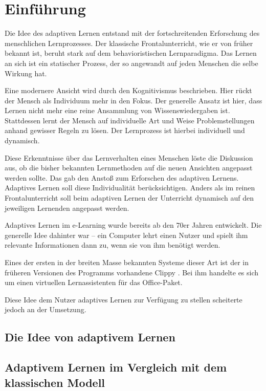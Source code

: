 \chapter{Einführung}

Die Idee des adaptiven Lernen entstand mit der fortschreitenden
Erforschung des menschlichen Lernprozesses.
Der klassische Frontalunterricht, wie er von früher bekannt ist,
beruht stark auf dem behavioristischen Lernparadigma.
Das Lernen an sich ist ein statischer Prozess, der so angewandt
auf jeden Menschen die selbe Wirkung hat.

Eine modernere Ansicht wird durch den Kognitivismus
beschrieben. Hier rückt der Mensch als Individuum mehr in den Fokus.
Der generelle Ansatz ist hier, dass Lernen nicht mehr eine reine
Ansammlung von Wissenswiedergaben ist. Stattdessen lernt der Mensch
auf individuelle Art und Weise Problemstellungen anhand gewisser Regeln zu lösen.
Der Lernprozess ist hierbei individuell und dynamisch.

Diese Erkenntnisse über das Lernverhalten eines Menschen löste die Diskussion aus,
ob die bisher bekannten Lernmethoden auf die neuen Ansichten angepasst werden sollte.
Das gab den Anstoß zum Erforschen des adaptiven Lernens.
Adaptives Lernen soll diese Individualität berücksichtigen.
Anders als im reinen Frontalunterricht soll beim adaptiven Lernen
der Unterricht dynamisch auf den jeweiligen Lernenden angepasst werden.



Adaptives Lernen im e-Learning wurde bereits
ab den 70er Jahren entwickelt. Die generelle Idee
dahinter war -- ein Computer lehrt einen Nutzer
und spielt ihm relevante Informationen dann zu,
wenn sie von ihm benötigt werden.

Eines der ersten in der breiten Masse bekannten
Systeme dieser Art ist der in früheren Versionen
des Programms vorhandene \glqq Clippy \grqq .
Bei ihm handelte es sich um einen virtuellen
Lernassistenten für das Office-Paket.

Diese Idee dem Nutzer adaptives Lernen zur Verfügung zu
stellen scheiterte jedoch an der Umsetzung.

\section{Die Idee von adaptivem Lernen}


\section{Adaptivem Lernen im Vergleich mit dem klassischen Modell}
